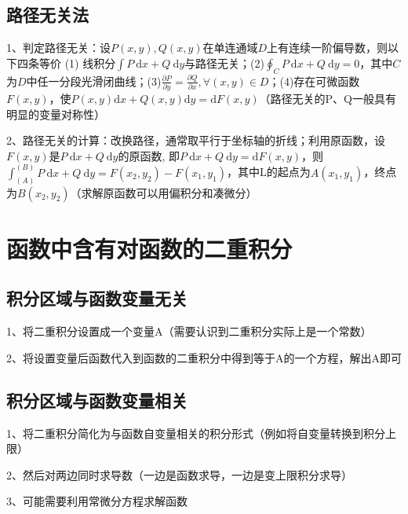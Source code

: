 \subsection{路径无关法}

1、判定路径无关：设$P(x, y), Q(x, y)$在单连通域$D$上有连续一阶偏导数，则以下四条等价 (1) 线积分$\int P \mathrm{~d} x+Q \mathrm{~d} y$与路径无关；(2)$\oint_{C} P \mathrm{~d} x+Q \mathrm{~d} y=0$，其中$C$为$D$中任一分段光滑闭曲线；(3)$\frac{\partial P}{\partial y}=\frac{\partial Q}{\partial x}, \forall(x, y) \in D$；(4)存在可微函数$F(x, y)$，使$P(x, y) \mathrm{d} x+Q(x, y) \mathrm{d} y=\mathrm{d} F(x, y)$（路径无关的P、Q一般具有明显的变量对称性）

2、路径无关的计算：改换路径，通常取平行于坐标轴的折线；利用原函数，设$F(x, y)$是$P \mathrm{~d} x+Q \mathrm{~d} y$的原函数, 即$P \mathrm{~d} x+Q \mathrm{~d} y=\mathrm{d} F(x, y)$，则$\int_{(A)}^{(B)} P \mathrm{~d} x+Q \mathrm{~d} y=F\left(x_{2}, y_{2}\right)-F\left(x_{1}, y_{1}\right)$，其中L的起点为$A\left(x_{1}, y_{1}\right)$，终点为$B\left(x_{2}, y_{2}\right)$（求解原函数可以用偏积分和凑微分）

\section{函数中含有对函数的二重积分}



\subsection{积分区域与函数变量无关}

1、将二重积分设置成一个变量A（需要认识到二重积分实际上是一个常数）

2、将设置变量后函数代入到函数的二重积分中得到等于A的一个方程，解出A即可



\subsection{积分区域与函数变量相关}

1、将二重积分简化为与函数自变量相关的积分形式（例如将自变量转换到积分上限）

2、然后对两边同时求导数（一边是函数求导，一边是变上限积分求导）

3、可能需要利用常微分方程求解函数


